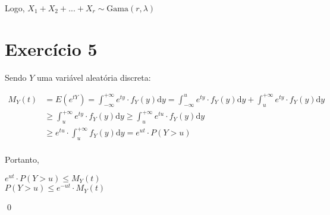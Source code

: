 \documentclass[12pt,letterpaper]{article}
\begin{document}
	Logo, $X_1 + X_2 + ... + X_r \sim \text{Gama}(r, \lambda)$ 
	
	\section*{Exercício 5}
	
	Sendo $Y$ uma variável aleatória discreta:
	
	\begin{equation*}
		\begin{split}
			M_Y(t) & = E(e^{tY}) = \int_{-\infty}^{+\infty} e^{ty} \cdot f_Y(y)\text{d}y = \int_{-\infty}^{u} e^{ty} \cdot f_Y(y)\text{d}y + \int_{u}^{+\infty} e^{ty} \cdot f_Y(y)\text{d}y \\
			& \geq \int_{u}^{+\infty} e^{ty} \cdot f_Y(y)\text{d}y \geq \int_{u}^{+\infty} e^{tu} \cdot f_Y(y)\text{d}y \\
			& \geq e^{tu} \cdot \int_{u}^{+\infty} f_Y(y)\text{d}y = e^{ut} \cdot P(Y > u)\\
		\end{split}
	\end{equation*}
	
	Portanto,
	
	\begin{center}
		$e^{ut} \cdot P(Y > u) \leq M_Y(t)$ \\
		$P(Y > u) \leq e^{-ut} \cdot M_Y(t)$ \\
	\end{center}
	 
	\qed 
	 
\end{document}
